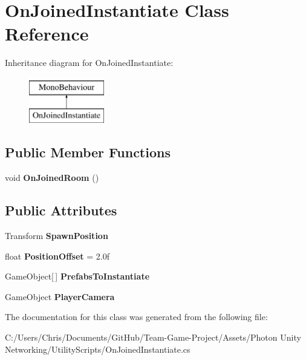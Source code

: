 \hypertarget{class_on_joined_instantiate}{}\section{On\+Joined\+Instantiate Class Reference}
\label{class_on_joined_instantiate}
Inheritance diagram for On\+Joined\+Instantiate\+:\begin{figure}[H]
\begin{center}
\leavevmode
\includegraphics[height=2.000000cm]{class_on_joined_instantiate}
\end{center}
\end{figure}
\subsection*{Public Member Functions}
\begin{DoxyCompactItemize}
\item 
void {\bfseries On\+Joined\+Room} ()\hypertarget{class_on_joined_instantiate_ad0c97d890632de549b835a46204e2339}{}\label{class_on_joined_instantiate_ad0c97d890632de549b835a46204e2339}

\end{DoxyCompactItemize}
\subsection*{Public Attributes}
\begin{DoxyCompactItemize}
\item 
Transform {\bfseries Spawn\+Position}\hypertarget{class_on_joined_instantiate_aa263e65b49298aaf137c2de1bf8e2414}{}\label{class_on_joined_instantiate_aa263e65b49298aaf137c2de1bf8e2414}

\item 
float {\bfseries Position\+Offset} = 2.\+0f\hypertarget{class_on_joined_instantiate_a5c87d1af9e4da3d06e67879299492743}{}\label{class_on_joined_instantiate_a5c87d1af9e4da3d06e67879299492743}

\item 
Game\+Object\mbox{[}$\,$\mbox{]} {\bfseries Prefabs\+To\+Instantiate}\hypertarget{class_on_joined_instantiate_a2a93970211d73e8110535c65f10e4631}{}\label{class_on_joined_instantiate_a2a93970211d73e8110535c65f10e4631}

\item 
Game\+Object {\bfseries Player\+Camera}\hypertarget{class_on_joined_instantiate_a2b51d7c4fe95905cabe75bc8b8cb774c}{}\label{class_on_joined_instantiate_a2b51d7c4fe95905cabe75bc8b8cb774c}

\end{DoxyCompactItemize}


The documentation for this class was generated from the following file\+:\begin{DoxyCompactItemize}
\item 
C\+:/\+Users/\+Chris/\+Documents/\+Git\+Hub/\+Team-\/\+Game-\/\+Project/\+Assets/\+Photon Unity Networking/\+Utility\+Scripts/On\+Joined\+Instantiate.\+cs\end{DoxyCompactItemize}
